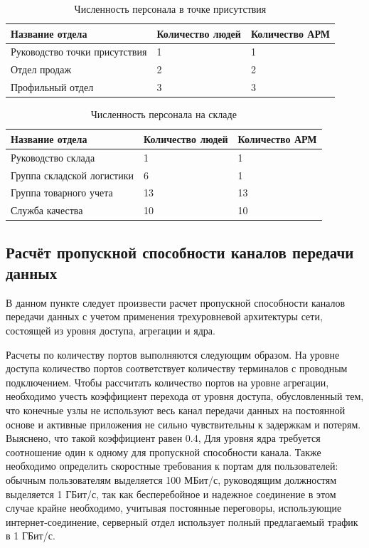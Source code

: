 \documentclass[14pt, a4paper]{extarticle}
\numberwithin{equation}{section}
\begin{document}
\begin{table}[H]
\centering
\small
\caption{Численность персонала в точке присутствия}
\begin{tabular}{|m{5cm}|m{3cm}|m{3cm}|}
\hline
\textbf{Название отдела} & \textbf{Количество людей} & \textbf{Количество АРМ} \\
\hline
Руководство точки присутствия & 1 & 1 \\
\hline
Отдел продаж & 2 & 2 \\
\hline
Профильный отдел & 3 & 3 \\
\hline
\end{tabular}
\label{table:tpPopul}
\end{table}


\begin{table}[H]
\centering
\small
\caption{Численность персонала на складе}
\begin{tabular}{|m{4cm}|m{3cm}|m{3cm}|}
\hline
\textbf{Название отдела} & \textbf{Количество людей} & \textbf{Количество АРМ} \\
\hline
Руководство склада & 1 & 1 \\
\hline
Группа складской логистики & 6 & 1 \\
\hline
Группа товарного учета & 13 & 13 \\
\hline
Служба качества & 10 & 10 \\
\hline
\end{tabular}
\label{table:warehousePopul}
\end{table}


\subsection{Расчёт пропускной способности каналов передачи данных}
В данном пункте следует произвести расчет пропускной способности каналов передачи 
данных с учетом применения трехуровневой архитектуры сети, состоящей 
из уровня доступа, агрегации и ядра. 

Расчеты по количеству портов выполняются следующим образом.
На уровне доступа количество портов соответствует количеству терминалов 
с проводным подключением. 
Чтобы рассчитать количество портов на уровне агрегации, необходимо 
учесть коэффициент перехода от уровня доступа, обусловленный тем, 
что конечные узлы не используют весь канал передачи данных на 
постоянной основе и активные приложения не сильно 
чувствительны к задержкам и потерям. Выяснено, что такой коэффициент равен 0.4,
Для уровня ядра требуется соотношение один к одному для пропускной способности канала.
Также необходимо определить скоростные требования
к портам для пользователей: обычным пользователям выделяется 
100 МБит/с, руководящим должностям выделяется 1 ГБит/с, так как 
бесперебойное и надежное соединение в 
этом случае крайне необходимо, учитывая постоянные 
переговоры, использующие интернет-соединение, серверный отдел 
использует полный предлагаемый трафик в 1 ГБит/с. 
\end{document}
